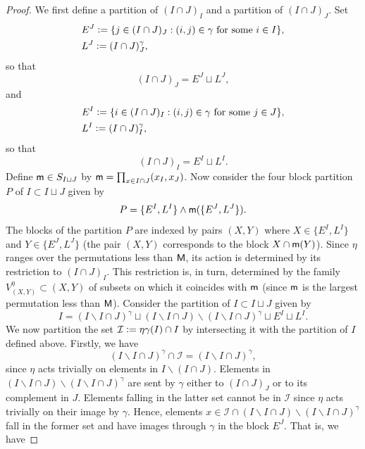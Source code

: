 \documentclass[11pt, a4paper, oneside, reqno]{amsart}
\newcommand{\sM}{{\sf M}}
\theoremstyle{remark}
\theoremstyle{definition}
\numberwithin{equation}{section}
\begin{document}
\begin{proof}
    We first define a partition of $(I \cap J)_I$ and a partition of $(I \cap J)_J$. Set
    \begin{align*}
		 & E^J \vcentcolon= \{ j \in (I\cap J)_J : (i,j) \in  \gamma \text{ for some } i \in I \},         \\
		 & L^J \vcentcolon= (I\cap J)_J^{\gamma},
	\end{align*}
	so that
    \begin{equation*}
        (I\cap J)_J = E^J\sqcup L^J,
    \end{equation*}
    and
     \begin{align*}
		 & E^I \vcentcolon= \{ i \in (I\cap J)_I : (i,j) \in  \gamma \text{ for some } j \in J \},         \\
		 & L^I \vcentcolon= (I\cap J)_I^{\gamma},
	\end{align*}
    so that 
    \begin{equation*}
        (I\cap J)_I = E^I \sqcup L^I.
    \end{equation*}
   Define ${\sf m} \in S_{I \sqcup J}$ by ${\sf m} = \prod_{x \in I \cap J}(x_I, x_J)$. Now consider the four block partition $P$ of $I \subset I \sqcup J$  given by
    \begin{equation*}
        P = \{E^I, L^I\} \wedge {\sf m}(\{E^J, L^J\}).
    \end{equation*}
    The blocks of the partition $P$ are indexed by pairs $(X,Y)$ where $X \in \{E^I,L^I\}$ and $Y \in \{E^J, L^J\}$ (the pair $(X,Y)$ corresponds to the block $X \cap {\sf m}(Y)$).
    Since $\eta$ ranges over the permutations less than $\sM$, its action is determined by its restriction to $(I\cap J)_I$. This restriction is, in turn, determined by the family $V^{\eta}_{(X,Y)} \subset (X,Y)$ of subsets on which it coincides with  ${\sf m}$ (since ${\sf m}$ is the largest permutation less than ${\sf M}$).
    Consider the partition of $I \subset I \sqcup J$ given by
    $$
    I =(I\backslash I\cap J)^{\gamma} \sqcup (I\backslash I\cap J)\backslash (I\backslash I\cap J)^{\gamma}\sqcup E^I \sqcup L^I.
    $$ We now partition the set $\mathcal{I}\vcentcolon= \eta\gamma(I) \cap I$ by intersecting it with the partition of $I$ defined above. Firstly, we have
	$$
		(I\backslash I\cap J)^{\gamma} \cap \mathcal{I}=(I\backslash I\cap J)^{\gamma},
	$$
	since $\eta$ acts trivially on elements in $I\backslash (I \cap J)$. Elements in $(I\backslash I\cap J)\backslash(I\backslash I\cap J)^{\gamma}$ are sent by $\gamma$ either to $(I\cap J)_J$ or to its complement in $J$. Elements falling in the latter set cannot be in $\mathcal{I}$ since $\eta$ acts trivially on their image by $\gamma$. Hence, elements $x \in \mathcal{I}\cap (I\backslash I\cap J)\backslash(I\backslash I\cap J)^{\gamma}$ fall in the former set and have images through $\gamma$ in the block $E^J$. That is, we have 

\end{proof}
\end{document}
